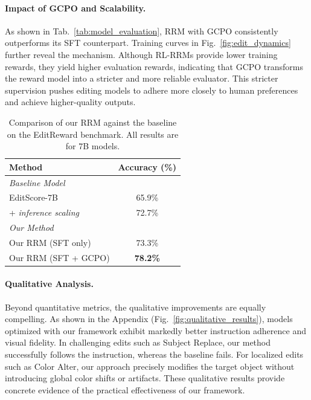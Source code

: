 \paragraph{Impact of GCPO and Scalability.} 
As shown in Tab.~\ref{tab:model_evaluation}, RRM with GCPO consistently outperforms its SFT counterpart. Training curves in Fig.~\ref{fig:edit_dynamics} further reveal the mechanism. Although RL-RRMs provide lower training rewards, they yield higher evaluation rewards, indicating that GCPO transforms the reward model into a stricter and more reliable evaluator. This stricter supervision pushes editing models to adhere more closely to human preferences and achieve higher-quality outputs.
\begin{table}[t!]
    \centering
    \caption{Comparison of our RRM against the baseline on the EditReward benchmark. All results are for 7B models.}
    \label{tab:editscore_benchmark_comparison}
    \renewcommand{\arraystretch}{1.15}
    \small
    \begin{tabular}{lc}
        \toprule
        \textbf{Method} & \textbf{Accuracy (\%)} \\
        \midrule
        \multicolumn{2}{l}{\textit{Baseline Model}} \\
        EditScore-7B & 65.9\% \\
        \quad + \textit{inference scaling} & 72.7\% \\
        \midrule
        \multicolumn{2}{l}{\textit{Our Method}} \\
        Our RRM (SFT only) & 73.3\% \\
        Our RRM (SFT + GCPO) & \textbf{78.2\%} \\
        \bottomrule
    \end{tabular}
\end{table}
\vspace{-1.0em}
\paragraph{Qualitative Analysis.} 
Beyond quantitative metrics, the qualitative improvements are equally compelling. As shown in the Appendix (Fig.~\ref{fig:qualitative_results}), models optimized with our framework exhibit markedly better instruction adherence and visual fidelity. 
In challenging edits such as Subject Replace, our method successfully follows the instruction, whereas the baseline fails. For localized edits such as Color Alter, our approach precisely modifies the target object without introducing global color shifts or artifacts. These qualitative results provide concrete evidence of the practical effectiveness of our framework.
\vspace{-1.0em}

